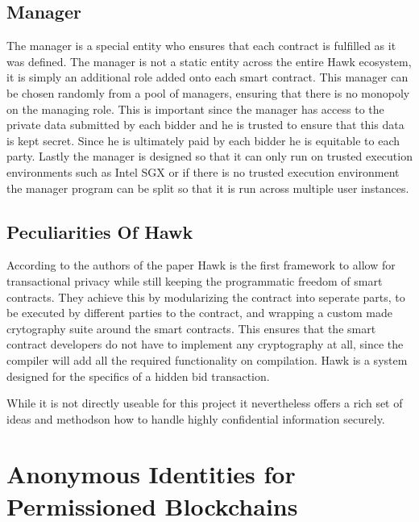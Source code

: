 \subsection{Manager}
The manager is a special entity who ensures that each contract is fulfilled as it was defined. The manager is not a static entity across the entire Hawk ecosystem, it is simply an additional role added onto each smart contract. This manager can be chosen randomly from a pool of managers, ensuring that there is no monopoly on the managing role. This is important since the manager has access to the private data submitted by each bidder and he is trusted to ensure that this data is kept secret. Since he is ultimately paid by each bidder he is equitable to each party. Lastly the manager is designed so that it can only run on trusted execution environments such as Intel SGX or if there is no trusted execution environment the manager program can be split so that it is run across multiple user instances.

\subsection{Peculiarities Of Hawk}
According to the authors of the paper Hawk is the first framework to allow for transactional privacy while still keeping the programmatic freedom of smart contracts. They achieve this by modularizing the contract into seperate parts, to be executed by different parties to the contract, and wrapping a custom made crytography suite around the smart contracts. This ensures that the smart contract developers do not have to implement any cryptography at all, since the compiler will add all the required functionality on compilation. Hawk is a system designed for the specifics of a hidden bid transaction.

While it is not directly useable for this project it nevertheless offers a rich set of ideas and methodson how to handle highly confidential information securely.

\section{Anonymous Identities for Permissioned Blockchains}

